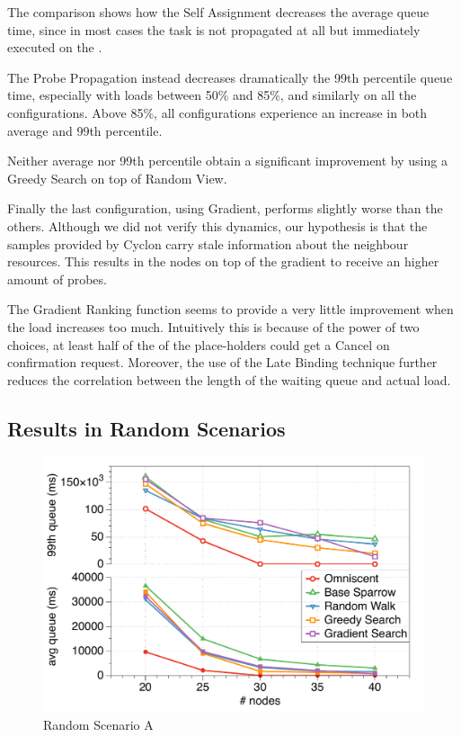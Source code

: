 \documentclass[conference]{IEEEtran}
\begin{document}
  The comparison shows how the Self Assignment decreases the average queue
  time, since in most cases the task is not propagated at all but
  immediately executed on the \tmast.

  The Probe Propagation instead decreases dramatically the 99th percentile
  queue time, especially with loads between 50\% and 85\%, and similarly on
  all the configurations. Above 85\%, all configurations experience an
  increase in both average and 99th percentile. 

  Neither average nor 99th percentile obtain a significant improvement by
  using a Greedy Search on top of Random View.

  Finally the last configuration, using Gradient, performs slightly worse
  than the others. Although we did not verify this dynamics, our hypothesis
  is that the samples provided by Cyclon carry stale information about the
  neighbour resources. This results in the nodes on top of the gradient to
  receive an higher amount of probes. 

  The Gradient Ranking function seems to provide a very little improvement
  when the load increases too much. Intuitively this is because of the power
  of two choices, at least half of the of the place-holders could get a
  Cancel on confirmation request. Moreover, the use of the Late Binding
  technique further reduces the correlation between the length of the
  waiting queue and actual load.

\subsection{Results in Random Scenarios}

  \begin{figure}
  \begin{center}
  \includegraphics[width=.5\textwidth]{figures/randomA}
  \caption{Random Scenario A}
  \label{fig:comparison}
  \end{center}
  \end{figure}
\end{document}

